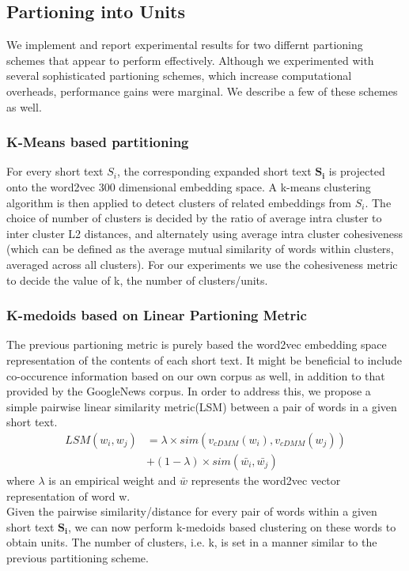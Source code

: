\documentclass{sig-alternate-05-2015}
\begin{document}
\subsection{Partioning into Units}
We implement and report experimental results for two differnt partioning schemes that appear to perform effectively. Although we experimented with several sophisticated partioning schemes, which increase computational overheads, performance gains were marginal. We describe a few of these schemes as well.
\subsubsection{K-Means based partitioning}
For every short text $S_{i}$, the corresponding expanded short text $\mathbf{S_{i}}$ is projected onto the word2vec 300 dimensional embedding space. A k-means clustering algorithm is then applied to detect clusters of related embeddings from $S_{i}$. The choice of number of clusters is decided by the ratio of average intra cluster to inter cluster L2 distances, and alternately using average intra cluster cohesiveness (which can be defined as the average mutual similarity of words within clusters, averaged across all clusters). For our experiments we use the cohesiveness metric to decide the value of k, the number of clusters/units.
\subsubsection{K-medoids based on Linear Partioning Metric}
The previous partioning metric is purely based the word2vec embedding space representation of the contents of each short text. It might be beneficial to include co-occurence information based on our own corpus as well, in addition to that provided by the GoogleNews corpus. In order to address this, we propose a simple pairwise linear similarity metric(LSM) between a pair of words in a given short text.
\\
\begin{align*}
LSM(w_{i}, w_{j}) &= \lambda \times sim(v_{cDMM}(w_{i}), v_{cDMM}(w_{j})) \\
&+ (1-\lambda) \times sim(\bar{w_{i}}, \bar{w_{j}})
\end{align*}
where $\lambda$ is an empirical weight and $\bar{w}$ represents the word2vec vector representation of word w.
\\
Given the pairwise similarity/distance for every pair of words within a given short text $\mathbf{S_{i}}$, we can now perform k-medoids based clustering on these words to obtain units. The number of clusters, i.e. k, is set in a manner similar to the previous partitioning scheme.
\end{document}
